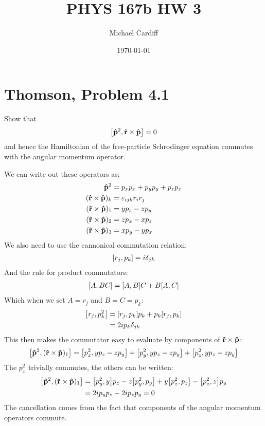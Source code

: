 \documentclass[12pt]{article}
\title{\vspace{-3em}PHYS 167b HW 3}
\author{Michael Cardiff}
\date{\today}
\newcommand{\veps}{\varepsilon}
\begin{document}
\maketitle
\section{Thomson, Problem 4.1}
\begin{problem}
  Show that
  \begin{align*}
    \comm{\vu{p}^2}{\vu{r}\times\vu{p}}=0
  \end{align*}
  and hence the Hamiltonian of the free-particle Schrodinger equation commutes with the angular momentum operator.
\end{problem}
We can write out these operators as:
\begin{align*}
  \vu{p}^2&=p_xp_x+p_yp_y+p_zp_z\\
  (\vu{r}\times\vu{p})_k&=\veps_{ijk}r_ir_j\\
  (\vu{r}\times\vu{p})_1&=yp_z-zp_y\\
  (\vu{r}\times\vu{p})_2&=zp_x-xp_z\\
  (\vu{r}\times\vu{p})_3&=xp_y-yp_x
\end{align*}
We also need to use the cannonical commutation relation:
\begin{align*}
  \comm{r_j}{p_k}=i\delta_{jk}
\end{align*}
And the rule for product commutators:
\begin{align*}
  \comm{A}{BC}=\comm{A}{B}C+B\comm{A}{C}
\end{align*}
Which when we set $A=r_j$ and $B=C=p_k$:
\begin{align*}
  \comm{r_j}{p_k^2}&=\comm{r_j}{p_k}p_k+p_k\comm{r_j}{p_k}\\
  &=2ip_k\delta_{jk}
\end{align*}
This then makes the commutator easy to evaluate by components of $\vu{r}\times\vu{p}$:
\begin{align*}
  \comm{\vu{p}^2}{(\vu{r}\times\vu{p})_1}=
  \comm{p_x^2}{yp_z-zp_y}+\comm{p_y^2}{yp_z-zp_y}+\comm{p_z^2}{yp_z-zp_y}
\end{align*}
The $p_x^2$ trivially commutes, the others can be written:
\begin{align*}
  \comm{\vu{p}^2}{(\vu{r}\times\vu{p})_1}&=
  \comm{p_y^2}{y}p_z-z\comm{p_y^2}{p_y}
  +y\comm{p_z^2}{p_z}-\comm{p_z^2}{z}p_y\\
  &=2ip_yp_z-2ip_zp_y=0
\end{align*}
The cancellation comes from the fact that components of the angular momentum operators commute.
\end{document}

